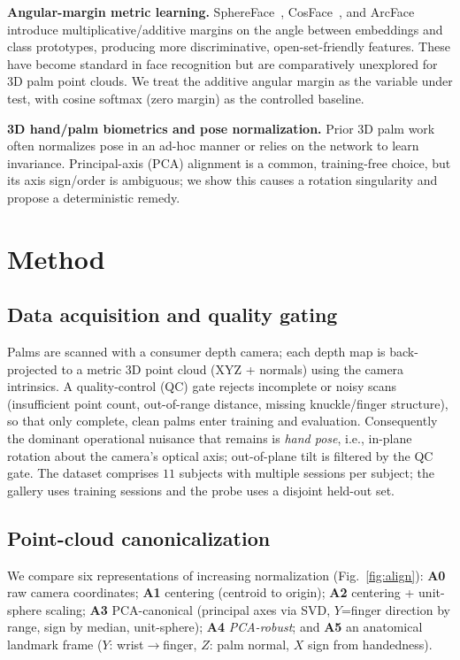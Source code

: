 \documentclass[conference]{IEEEtran}
\begin{document}
\textbf{Angular-margin metric learning.} SphereFace~\cite{liu2017sphereface},
CosFace~\cite{wang2018cosface}, and ArcFace~\cite{deng2019arcface} introduce
multiplicative/additive margins on the angle between embeddings and class
prototypes, producing more discriminative, open-set-friendly features. These have
become standard in face recognition but are comparatively unexplored for 3D palm
point clouds. We treat the additive angular margin as the variable under test,
with cosine softmax (zero margin) as the controlled baseline.

\textbf{3D hand/palm biometrics and pose normalization.} Prior 3D palm work often
normalizes pose in an ad-hoc manner or relies on the network to learn invariance.
Principal-axis (PCA) alignment is a common, training-free choice, but its axis
sign/order is ambiguous; we show this causes a rotation singularity and propose a
deterministic remedy.

\section{Method}
\subsection{Data acquisition and quality gating}
Palms are scanned with a consumer depth camera; each depth map is back-projected
to a metric 3D point cloud (XYZ + normals) using the camera intrinsics. A
quality-control (QC) gate rejects incomplete or noisy scans (insufficient point
count, out-of-range distance, missing knuckle/finger structure), so that only
complete, clean palms enter training and evaluation. Consequently the dominant
operational nuisance that remains is \emph{hand pose}, i.e., in-plane rotation
about the camera's optical axis; out-of-plane tilt is filtered by the QC gate.
The dataset comprises $11$ subjects with multiple sessions per subject;
the gallery uses training sessions and the probe uses a disjoint held-out set.

\subsection{Point-cloud canonicalization}
We compare six representations of increasing normalization (Fig.~\ref{fig:align}):
\textbf{A0} raw camera coordinates; \textbf{A1} centering (centroid to origin);
\textbf{A2} centering + unit-sphere scaling; \textbf{A3} PCA-canonical (principal
axes via SVD, $Y$=finger direction by range, sign by median, unit-sphere);
\textbf{A4} \emph{PCA-robust}; and \textbf{A5} an anatomical landmark frame
($Y$: wrist$\rightarrow$finger, $Z$: palm normal, $X$ sign from handedness).
\end{document}
